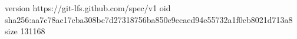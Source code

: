 version https://git-lfs.github.com/spec/v1
oid sha256:aa7c78ac17cba308bc7d27318756ba850e9ecaed94e55732a1f0cb8021d713a8
size 131168
